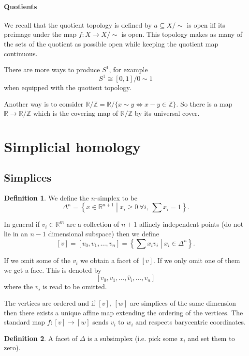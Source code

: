 \documentclass[12pt]{article}
\theoremstyle{definition}
\theoremstyle{definition}
\newtheorem*{defn}{Definition}
\newcommand{\ZZ}{\mathbb{Z}}
\newcommand{\RR}{\mathbb{R}}
\begin{document}
\paragraph{Quotients}
We recall that the quotient topology is defined by $a \subseteq X/\sim$ is open iff its preimage under the map $f\colon X \to X/\sim$ is open.
This topology makes as many of the sets of the quotient as possible open while keeping the quotient map continuous.

There are more ways to produce $S^1$, for example
\[S^1 \cong [0,1]/0\sim1\]
when equipped with the quotient topology.

Another way is to consider $\RR/\ZZ = \RR/\{x\sim y \iff x-y\in \ZZ\}$.
So there is a map $\RR \to \RR/\ZZ$ which is the covering map of $\RR/\ZZ$ by its universal cover.

\section{Simplicial homology}
\subsection{Simplices}
\begin{defn}
We define the $n$-simplex to be
\[\Delta^n = \left\{x\in \RR^{n+1} \middle| x_i \ge 0\ \forall i,\ \sum x_i = 1\right\}.\]
\end{defn}


In general if $v_i\in \RR^m$ are a collection of $n+1$ affinely independent points (do not lie in an $n-1$ dimensional subspace) then we define
\[[v] = [v_0,v_1,\ldots,v_n] = \left\{\sum x_i v_i \middle| x_i\in \Delta^n\right\}.\]


If we omit some of the $v_i$ we obtain a facet of $[v]$.
If we only omit one of them we get a face.
This is denoted by
\[[v_0,v_1, \ldots, \hat v_i, \ldots , v_n]\]
where the $v_i$ is read to be omitted.

The vertices are ordered and if $[v]$, $[w]$ are simplices of the same dimension then there exists a unique affine map extending the ordering of the vertices.
The standard map $f\colon [v]\to [w]$ sends $v_i$ to $w_i$ and respects barycentric coordinates. 


\begin{defn}
A facet of $\Delta$ is a subsimplex (i.e. pick some $x_i$ and set them to zero).
\end{defn}
\end{document}
